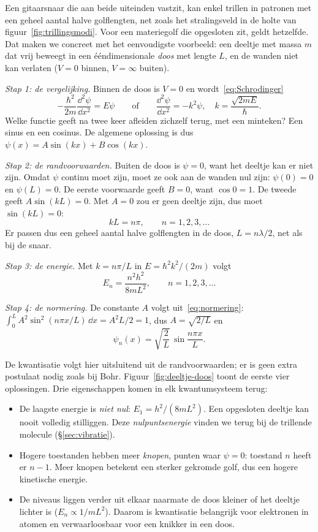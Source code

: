 Een gitaarsnaar die aan beide uiteinden vastzit, kan enkel trillen in patronen met een geheel aantal halve golflengten, net zoals het stralingsveld in de holte van figuur~\ref{fig:trillingsmodi}. Voor een materiegolf die opgesloten zit, geldt hetzelfde. Dat maken we concreet met het eenvoudigste voorbeeld: een deeltje met massa $m$ dat vrij beweegt in een ééndimensionale \emph{doos} met lengte $L$, en de wanden niet kan verlaten ($V=0$ binnen, $V=\infty$ buiten).

\emph{Stap 1: de vergelijking.} Binnen de doos is $V=0$ en wordt~\eqref{eq:Schrodinger}
\[
-\frac{\hbar^2}{2m}\frac{\dd^2\psi}{\dd x^2} = E\psi
\qquad\text{of}\qquad
\frac{\dd^2\psi}{\dd x^2} = -k^2\psi, \quad k=\frac{\sqrt{2mE}}{\hbar}.
\]
Welke functie geeft na twee keer afleiden zichzelf terug, met een minteken? Een sinus en een cosinus. De algemene oplossing is dus $\psi(x)=A\sin(kx)+B\cos(kx)$.

\emph{Stap 2: de randvoorwaarden.} Buiten de doos is $\psi = 0$, want het deeltje kan er niet zijn. Omdat $\psi$ continu moet zijn, moet ze ook aan de wanden nul zijn: $\psi(0)=0$ en $\psi(L)=0$. De eerste voorwaarde geeft $B=0$, want $\cos 0 = 1$. De tweede geeft $A\sin(kL)=0$. Met $A=0$ zou er geen deeltje zijn, dus moet $\sin(kL)=0$:
\[
kL = n\pi, \qquad n=1,2,3,\ldots
\]
Er passen dus een geheel aantal halve golflengten in de doos, $L = n\lambda/2$, net als bij de snaar.

\emph{Stap 3: de energie.} Met $k = n\pi/L$ in $E=\hbar^2k^2/(2m)$ volgt
\begin{equation}
\boxed{
E_n = \frac{n^2h^2}{8mL^2}, \qquad n=1,2,3,\ldots
}
\label{eq:deeltje-in-doos}
\end{equation}

\emph{Stap 4: de normering.} De constante $A$ volgt uit~\eqref{eq:normering}: $\int_0^L A^2\sin^2(n\pi x/L)\,\dd x = A^2 L/2 = 1$, dus $A = \sqrt{2/L}$ en
\[
\psi_n(x) = \sqrt{\frac{2}{L}}\,\sin\frac{n\pi x}{L}.
\]

De kwantisatie volgt hier uitsluitend uit de randvoorwaarden; er is geen extra postulaat nodig zoals bij Bohr. Figuur~\ref{fig:deeltje-doos} toont de eerste vier oplossingen. Drie eigenschappen komen in elk kwantumsysteem terug:
\begin{itemize}
\item De laagste energie is \emph{niet nul}: $E_1 = h^2/(8mL^2)$. Een opgesloten deeltje kan nooit volledig stilliggen. Deze \emph{nulpuntsenergie} vinden we terug bij de trillende molecule (\S\ref{sec:vibratie}).
\item Hogere toestanden hebben meer \emph{knopen}, punten waar $\psi = 0$: toestand $n$ heeft er $n-1$. Meer knopen betekent een sterker gekromde golf, dus een hogere kinetische energie.
\item De niveaus liggen verder uit elkaar naarmate de doos kleiner of het deeltje lichter is ($E_n \propto 1/mL^2$). Daarom is kwantisatie belangrijk voor elektronen in atomen en verwaarloosbaar voor een knikker in een doos.
\end{itemize}


